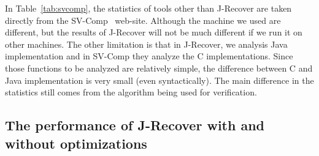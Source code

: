 \documentclass{llncs}
\begin{document}
In Table~\ref{tab:svcomp}, the statistics of tools other than J-Recover are taken directly from the SV-Comp~\cite{svcomp} web-site. Although the machine we used are different, but the results of J-Recover will not be much different if we run it on other machines. The other limitation is that in J-Recover, we analysis Java implementation and in SV-Comp they analyze the C implementations. Since those functions to be analyzed are relatively simple, the difference between C and Java implementation is very small (even syntactically). The main difference in the statistics still comes from the algorithm being used for verification.
\begin{table}[t]
	\caption{SV-Comp 2018 results on reducer commutativity. For space reason, we only list results of competitive tool in this table, which includes top three tools in the overall ranking and the reachability safety category.}
	\label{tab:svcomp}
\end{table}





\subsection{The performance of J-Recover with and without optimizations}
\end{document}
